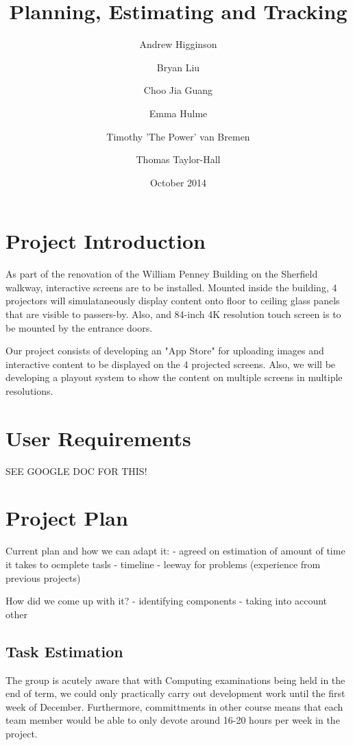 \documentclass[a4paper]{article}
\begin{document}
\title{Planning, Estimating and Tracking}
\author{Andrew Higginson \and Bryan Liu \and Choo Jia Guang \and Emma Hulme \and Timothy 'The Power' van Bremen \and Thomas Taylor-Hall}
\date{October 2014}
\maketitle

\linespread{1.1}

\section{Project Introduction}
As part of the renovation of the William Penney Building on the Sherfield 
walkway, interactive screens are to be installed. Mounted inside the building, 4
projectors will simulataneously display content onto floor to ceiling glass
panels that are visible to passers-by. Also, and 84-inch 4K resolution touch 
screen is to be mounted by the entrance doors. 

Our project consists of developing an "App Store" for uploading images and 
interactive content to be displayed on the 4 projected screens. Also, we will be
developing a playout system to show the content on multiple screens in multiple 
resolutions.

\section{User Requirements} \label{section:req}

SEE GOOGLE DOC FOR THIS!


\section{Project Plan}
Current plan and how we can adapt it:
	- agreed on estimation of amount of time it takes to ocmplete tasls
  - timeline
  - leeway for problems (experience from previous projects)

How did we come up with it? 
	- identifying components
	- taking into account other 

\subsection{Task Estimation}
The group is acutely aware that with Computing examinations being held in the
end of term, we could only practically carry out development work until the
first week of December. Furthermore, committments in other course means that 
each team member would be able to only devote around 16-20 hours per week in
the project.
\end{document}

